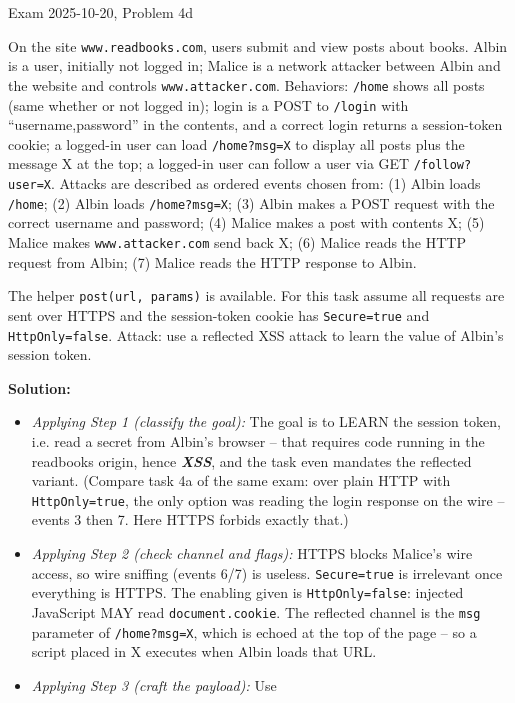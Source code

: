 \documentclass[12pt, a4paper]{article}
\newcommand{\term}[1]{\textbf{\textit{#1}}}        %
\begin{document}
\begin{practicebox}{Exam 2025-10-20, Problem 4d}
\begin{problembox}
On the site \texttt{www.readbooks.com}, users submit and view posts about books. Albin is a user, initially not logged in; Malice is a network attacker between Albin and the website and controls \texttt{www.attacker.com}. Behaviors: \texttt{/home} shows all posts (same whether or not logged in); login is a POST to \texttt{/login} with ``username,password'' in the contents, and a correct login returns a session-token cookie; a logged-in user can load \texttt{/home?msg=X} to display all posts plus the message X at the top; a logged-in user can follow a user via GET \texttt{/follow?user=X}. Attacks are described as ordered events chosen from: (1) Albin loads \texttt{/home}; (2) Albin loads \texttt{/home?msg=X}; (3) Albin makes a POST request with the correct username and password; (4) Malice makes a post with contents X; (5) Malice makes \texttt{www.attacker.com} send back X; (6) Malice reads the HTTP request from Albin; (7) Malice reads the HTTP response to Albin.

The helper \texttt{post(url, params)} is available. For this task assume all requests are sent over HTTPS and the session-token cookie has \texttt{Secure=true} and \texttt{HttpOnly=false}. Attack: use a reflected XSS attack to learn the value of Albin's session token.
\end{problembox}

\textbf{Solution:}
\begin{itemize}
    \item \textit{Applying Step 1 (classify the goal):} The goal is to LEARN the session token, i.e. read a secret from Albin's browser -- that requires code running in the readbooks origin, hence \term{XSS}, and the task even mandates the reflected variant. (Compare task 4a of the same exam: over plain HTTP with \texttt{HttpOnly=true}, the only option was reading the login response on the wire -- events 3 then 7. Here HTTPS forbids exactly that.)
    \item \textit{Applying Step 2 (check channel and flags):} HTTPS blocks Malice's wire access, so wire sniffing (events 6/7) is useless. \texttt{Secure=true} is irrelevant once everything is HTTPS.
    The enabling given is \texttt{HttpOnly=false}: injected JavaScript MAY read \texttt{document.cookie}. The reflected channel is the \texttt{msg} parameter of \texttt{/home?msg=X}, which is echoed at the top of the page -- so a script placed in X executes when Albin loads that URL.
    \item \textit{Applying Step 3 (craft the payload):} Use


\end{itemize}
\end{practicebox}
\end{document}
